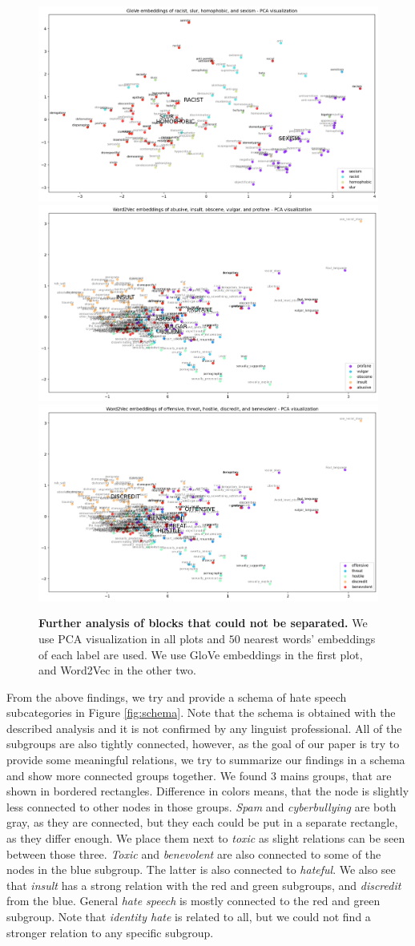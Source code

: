 \documentclass[fleqn,moreauthors,10pt]{ds_report}
\begin{document}
\begin{figure}[htb]\centering
	\includegraphics[width=0.33 \linewidth]{Further analysis - Glove - PCA.png}
	\includegraphics[width=0.33 \linewidth]{Further analysis1 Word2Vec - PCA.png}
	\includegraphics[width=0.33 \linewidth]{Further analysis2 Word2Vec - PCA.png}
	\caption{\textbf{Further analysis of blocks that could not be separated.} We use PCA visualization in all plots and $50$ nearest words' embeddings of each label are used. We use GloVe embeddings in the first plot, and Word2Vec in the other two.}
	\label{fig:further1}
\end{figure}

From the above findings, we try and provide a schema of hate speech subcategories in Figure \ref{fig:schema}. Note that the schema is obtained with the described analysis and it is not confirmed by any linguist professional. All of the subgroups are also tightly connected, however, as the goal of our paper is try to provide some meaningful relations, we try to summarize our findings in a schema and show more connected groups together. We found $3$ mains groups, that are shown in bordered rectangles. Difference in colors means, that the node is slightly less connected to other nodes in those groups. \textit{Spam} and \textit{cyberbullying} are both gray, as they are connected, but they each could be put in a separate rectangle, as they differ enough. We place them next to \textit{toxic} as slight relations can be seen between those three. \textit{Toxic} and \textit{benevolent} are also connected to some of the nodes in the blue subgroup. The latter is also connected to \textit{hateful}. We also see that \textit{insult} has a strong relation with the red and green subgroups, and \textit{discredit} from the blue. General \textit{hate speech} is mostly connected to the red and green subgroup. Note that \textit{identity hate} is related to all, but we could not find a stronger relation to any specific subgroup.
\end{document}
